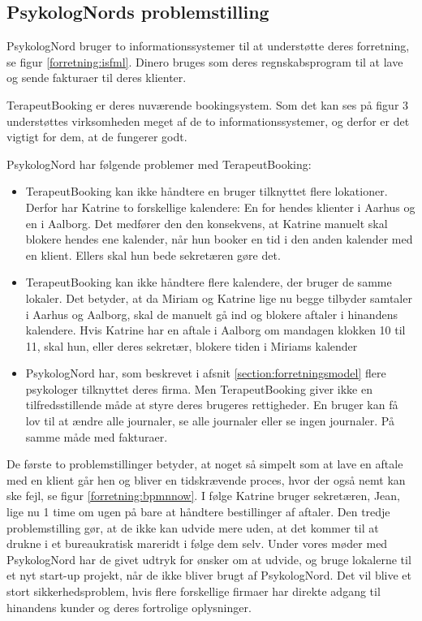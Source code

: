 \subsection{PsykologNords problemstilling}
\label{section:problemstilling}

PsykologNord bruger to informationssystemer til at understøtte deres forretning, se figur \ref{forretning:isfml}.
Dinero bruges som deres regnskabsprogram til at lave og sende fakturaer til deres klienter.

TerapeutBooking er deres nuværende bookingsystem.
Som det kan ses på figur 3 understøttes virksomheden meget af de to informationssystemer, og derfor er det vigtigt for dem, at de fungerer godt.

PsykologNord har følgende problemer med TerapeutBooking:

\begin{itemize}
    \item TerapeutBooking kan ikke håndtere en bruger tilknyttet flere lokationer.
    Derfor har Katrine to forskellige kalendere: En for hendes klienter i Aarhus og en i Aalborg.
    Det medfører den den konsekvens, at Katrine manuelt skal blokere hendes ene kalender, når hun booker en tid i den anden kalender med en klient. Ellers skal hun bede sekretæren gøre det.
    
    \item TerapeutBooking kan ikke håndtere flere kalendere, der bruger de samme lokaler.
    Det betyder, at da Miriam og Katrine lige nu begge tilbyder samtaler i Aarhus og Aalborg, skal de manuelt gå ind og blokere aftaler i hinandens kalendere.
    Hvis Katrine har en aftale i Aalborg om mandagen klokken 10 til 11, skal hun, eller deres sekretær, blokere tiden i Miriams kalender
    
   \item PsykologNord har, som beskrevet i afsnit \ref{section:forretningsmodel} flere psykologer tilknyttet deres firma.
   Men TerapeutBooking giver ikke en tilfredsstillende måde at styre deres brugeres rettigheder.
   En bruger kan få lov til at ændre alle journaler, se alle journaler eller se ingen journaler.
   På samme måde med fakturaer.
\end{itemize}

De første to problemstillinger betyder, at noget så simpelt som at lave en aftale med en klient går hen og bliver en tidskrævende proces, hvor der også nemt kan ske fejl, se figur \ref{forretning:bpmnnow}.
I følge Katrine bruger sekretæren, Jean, lige nu 1 time om ugen på bare at håndtere bestillinger af aftaler.
Den tredje problemstilling gør, at de ikke kan udvide mere uden, at det kommer til at drukne i et bureaukratisk mareridt i følge dem selv.
Under vores møder med PsykologNord har de givet udtryk for ønsker om at udvide, og bruge lokalerne til et nyt start-up projekt, når de ikke bliver brugt af PsykologNord.
Det vil blive et stort sikkerhedsproblem, hvis flere forskellige firmaer har direkte adgang til hinandens kunder og deres fortrolige oplysninger.



